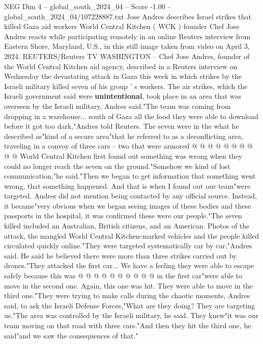 \begin{textsample}{NEG Dim 4 – global\_south\_2024\_04 – Score -1.00 – global\_south\_2024\_04/107228887.txt}  \label{ex:f4_neg_196}
Jose Andres describes Israel strikes that killed Gaza aid workers World Central Kitchen ( WCK ) founder Chef Jose Andres reacts while participating remotely in an online Reuters interview from Eastern Shore, Maryland, U.S., in this still image taken from video on April 3, 2024.
REUTERS/Reuters TV WASHINGTON -- Chef Jose Andres, founder of the World Central Kitchen aid agency, described in a Reuters interview on Wednesday the devastating attack in Gaza this week in which strikes by the Israeli military killed seven of his group ' s workers.
The air strikes, which the Israeli government said were \textbf{unintentional}, took place in an area that was overseen by the Israeli military, Andres said."The team was coming from dropping in a warehouse... south of Gaza all the food they were able to download before it got too dark,"Andres told Reuters.
The seven were in the what he described as"kind of a secure area"that he referred to as a deconflicting area, traveling in a convoy of three cars -- two that were armored @ @ @ @ @ @ @ @ @ @ World Central Kitchen first found out something was wrong when they could no longer reach the seven on the ground."Somehow we kind of lost communication,"he said."Then we began to get information that something went wrong, that something happened.
And that is when I found out our team"were targeted.
Andres did not mention being contacted by any official source.
Instead, it became"very obvious when we began seeing images of these bodies and these passports in the hospital, it was confirmed these were our people."The seven killed included an Australian, British citizens, and an American.
Photos of the attack, the mangled World Central Kitchen-marked vehicles and the people killed circulated quickly online."They were targeted systematically car by car,"Andres said.
He said he believed there were more than three strikes carried out by drones."They attacked the first car...
We have a feeling they were able to escape safely because this was @ @ @ @ @ @ @ @ @ @ in the first car"were able to move in the second one.
Again, this one was hit.
They were able to move in the third one."They were trying to make calls during the chaotic moments, Andres said, to ask the Israeli Defense Forces,"What are they doing?
They are targeting us."The area was controlled by the Israeli military, he said.
They knew"it was our team moving on that road with three cars."And then they hit the third one, he said"and we saw the consequences of that."

\end{textsample}
